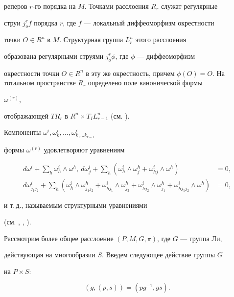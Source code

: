 реперов $r$-го порядка на $M$. Точками расслоения $R_r$ служат регулярные


струи $j^r_o f$ порядка $r$, где $f$ --- локальный диффеоморфизм окрестности


точки $O \in R^n$ в $M$. Структурная группа $L^n_r$ этого расслоения


образована регулярными струями $j^r_o \phi$, где $\phi$ --- диффеоморфизм


окрестности точки $O \in R^n$ в эту же окрестность, причем $\phi(O) =


O$. На тотальном пространстве $R_r$ определено поле канонической формы


$\omega^{(r)}$,


отображающей $TR_r$ в $R^n \times T_I L^n_{r-1}$ (см. \cite{2}).


Компоненты $\omega^i, \omega^i_k,\dotsc,\omega^i_{k_1\dotsc k_{r-1}}$


формы $\omega^{(r)}$ удовлетворяют уравнениям


\begin{align*}


d\omega^i + \sum_h \omega^i_h \wedge \omega^h, \ 


d \omega^i_j + \sum_h (\omega^i_h \wedge \omega^h_j +


\omega^i_{hj} \wedge \omega^h) &= 0,\\


d \omega^i_{j_1 j_2} + \sum_h (\omega^i_h \wedge \omega^h_{j_1 j_2} +


\omega^i_{h j_1} \wedge \omega^h_{j_2} +


\omega^i_{h j_2} \wedge \omega^h_{j_1} +


\omega^i_{h j_1 j_2} \wedge \omega^h) &= 0,


\end{align*}


и т.\,д., называемым структурными уравнениями


(см. \cite{3}, \cite{1}, \cite{4}).





Рассмотрим более общее расслоение $(P,M,G,\pi)$, где $G$ --- группа Ли,


действующая на многообразии $S$. Введем следующее действие группы $G$


на $P \times S$:


$$


(g, (p,s)) = (pg^{-1}, gs).


$$


